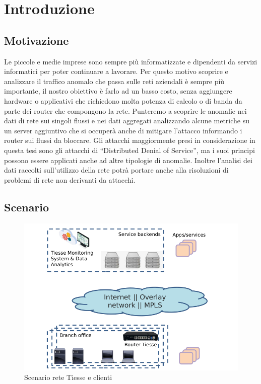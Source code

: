 \chapter{Introduzione}

\section{Motivazione}

Le piccole e medie imprese sono sempre più informatizzate e dipendenti da servizi informatici per poter continuare a lavorare. Per questo motivo scoprire e analizzare il traffico anomalo che passa sulle reti aziendali è sempre più importante, il nostro obiettivo è farlo ad un basso costo, senza aggiungere hardware o applicativi che richiedono molta potenza di calcolo o di banda da parte dei router che compongono la rete. Punteremo a scoprire le anomalie nei dati di rete sui singoli flussi e nei dati aggregati analizzando alcune metriche su un server aggiuntivo che si occuperà anche di mitigare l'attacco informando i router sui flussi da bloccare.
Gli attacchi maggiormente presi in considerazione in questa tesi sono gli attacchi di ``Distributed Denial of Service'', ma i suoi principi possono essere applicati anche ad altre tipologie di anomalie.
Inoltre l'analisi dei dati raccolti sull'utilizzo della rete potrà portare anche alla risoluzioni di problemi di rete non derivanti da attacchi.

\section{Scenario}
\begin{figure}[]
    \label{fig:scenario}
    \includegraphics[width=\hsize]{images/introduzione/scenario_2.png}
    \caption{Scenario rete Tiesse e clienti}
    \centering
\end{figure}

